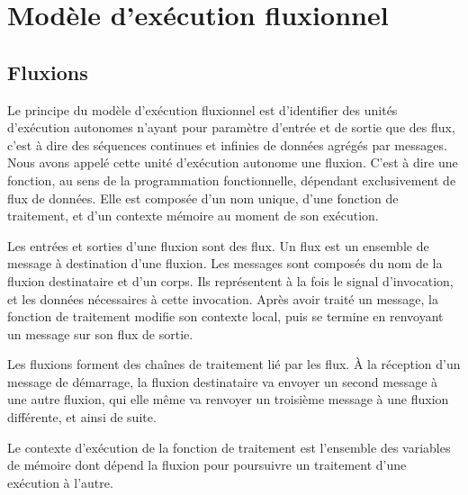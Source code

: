 \section{Modèle d'exécution fluxionnel}

\subsection{Fluxions}

Le principe du modèle d'exécution fluxionnel est d'identifier des unités d'exécution autonomes n'ayant pour paramètre d'entrée et de sortie que des flux, c'est à dire des séquences continues et infinies de données agrégés par messages.
Nous avons appelé cette unité d'exécution autonome une fluxion.
C'est à dire une fonction, au sens de la programmation fonctionnelle, dépendant exclusivement de flux de données.
Elle est composée d'un nom unique, d'une fonction de traitement, et d'un contexte mémoire au moment de son exécution.

Les entrées et sorties d'une fluxion sont des flux.
Un flux est un ensemble de message à destination d'une fluxion.
Les messages sont composés du nom de la fluxion destinataire et d'un corps.
Ils représentent à la fois le signal d'invocation, et les données nécessaires à cette invocation.
Après avoir traité un message, la fonction de traitement modifie son contexte local, puis se termine en renvoyant un message sur son flux de sortie.

Les fluxions forment des chaînes de traitement lié par les flux.
À la réception d'un message de démarrage, la fluxion destinataire va envoyer un second message à une autre fluxion, qui elle même va renvoyer un troisième message à une fluxion différente, et ainsi de suite.

Le contexte d'exécution de la fonction de traitement est l'ensemble des variables de mémoire dont dépend la fluxion pour poursuivre un traitement d'une exécution à l'autre.


